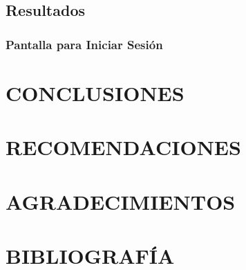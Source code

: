\documentclass[stu, 12pt, letterpaper, donotrepeattitle, floatsintext, natbib]{apa7}
\begin{document}
    \subsection{Resultados}
    \subsubsection{Pantalla para Iniciar Sesi\'on}
    \section{\large CONCLUSIONES}
    \section{\large RECOMENDACIONES}
    \section{\large AGRADECIMIENTOS}
    \section{\large BIBLIOGRAF\'IA}
\end{document}
